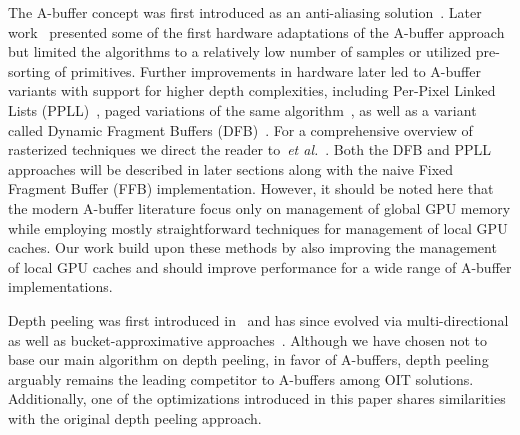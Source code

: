 \documentclass{egpubl}
\def\etal{\emph{et al.}}
\newcommand{\red}[1]{{\color{red}#1}}
\newcommand{\ab}{\mbox{A-buffer}}
\begin{document}
The \ab{} concept was first introduced as an anti-aliasing solution~\cite{Carpenter1984}. 
Later work~\cite{ebert1990abuffer,callahan2005kbuffer,bavoil2007multifragkbuffer,myers2007techrep} presented some of the first hardware adaptations of the \ab{} approach but limited the algorithms to a relatively low number of samples or utilized pre-sorting of primitives. 
Further improvements in hardware later led to \ab{} variants with support for higher depth complexities, including Per-Pixel Linked Lists (PPLL)~\cite{Yang2010}, paged variations of the same algorithm~\cite{kainz2009ray,Crassin2010}, as well as a variant called Dynamic Fragment Buffers (DFB)~\cite{Maule2012}. 
For a comprehensive overview of rasterized techniques we direct the reader to~\etal~\cite{Maule2011}.
%
Both the DFB and PPLL approaches will be described in later sections along with the naive Fixed Fragment Buffer (FFB) implementation. 
However, it should be noted here that the modern \ab{} literature focus only on management of global GPU memory while employing mostly straightforward techniques for management of local GPU caches. 
Our work build upon these methods by also improving the management of local GPU caches and should improve performance for a wide range of \ab{} implementations.

Depth peeling was first introduced in~\cite{Mammen1989} and has since evolved via multi-directional as well as bucket-approximative approaches~\cite{Everitt2001,wexler2005hiddensurface,carr2008depthpeel,Bavoil2008,Liu2009}. 
Although we have chosen not to base our main algorithm on depth peeling, in favor of \ab{}s, depth peeling arguably remains the leading competitor to \ab{}s among OIT solutions. Additionally, one of the optimizations introduced in this paper shares similarities with the original depth peeling approach. 


\end{document}
